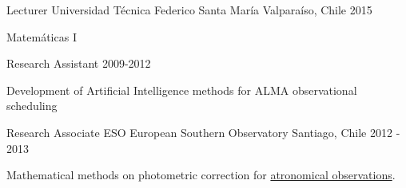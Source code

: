 \begin{cventries}
  \cventry
    {Lecturer} %
    {Universidad T\'ecnica Federico Santa Mar\'ia } %
    {Valpara\'iso, Chile} %
    {2015} %
    {
      \begin{cvitems} %
        \item {Matem\'aticas I}
      \end{cvitems}
    }

    \cventry
{Research Assistant} %
{} %
{} %
{2009-2012} %
{
	\begin{cvitems} %
		\item {Development of Artificial Intelligence methods for ALMA observational scheduling}
	\end{cvitems}
}



\cventry
{Research Associate} %
{ESO European Southern Observatory} %
{Santiago, Chile} %
{2012 - 2013} %
{
	\begin{cvitems} %
		\item {Mathematical methods on photometric correction for \href{http://www.eso.org/public/teles-instr/vlt}{atronomical observations}.}
	\end{cvitems}
}



\end{cventries}

